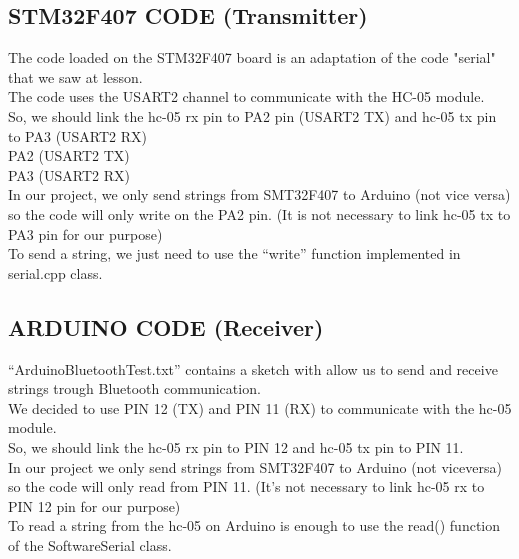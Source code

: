 \subsection{STM32F407 CODE (Transmitter)}
The code loaded on the STM32F407 board is an adaptation of the code "serial" that we saw at lesson.\\
The code uses the USART2 channel to communicate with the HC-05 module.\\
So, we should link the hc-05 rx pin to PA2 pin (USART2 TX) and hc-05 tx pin to PA3 (USART2 RX)\\
PA2 (USART2 TX)\\
PA3 (USART2 RX)\\
In our project, we only send strings from SMT32F407 to Arduino (not vice versa) so the code will only write on the PA2 pin. (It is not necessary to link hc-05 tx to PA3 pin for our purpose)\\
To send a string, we just need to use the “write” function implemented in serial.cpp class.\\

\subsection{ARDUINO CODE (Receiver)}
“ArduinoBluetoothTest.txt” contains a sketch with allow us to send and receive strings trough Bluetooth communication.\\
We decided to use PIN 12 (TX) and PIN 11 (RX) to communicate with the hc-05 module.\\
So, we should link the hc-05 rx pin to PIN 12 and hc-05 tx pin to PIN 11.\\
In our project we only send strings from SMT32F407 to Arduino (not viceversa) so the code will only read from PIN 11. (It’s not necessary to link hc-05 rx to PIN 12 pin for our purpose)\\
To read a string from the hc-05 on Arduino is enough to use the read() function of the SoftwareSerial class.\\